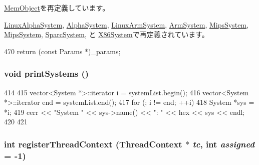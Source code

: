 \hyperlink{classMemObject_acd3c3feb78ae7a8f88fe0f110a718dff}{MemObject}を再定義しています。

\hyperlink{classLinuxAlphaSystem_acd3c3feb78ae7a8f88fe0f110a718dff}{LinuxAlphaSystem}, \hyperlink{classAlphaSystem_acd3c3feb78ae7a8f88fe0f110a718dff}{AlphaSystem}, \hyperlink{classLinuxArmSystem_acd3c3feb78ae7a8f88fe0f110a718dff}{LinuxArmSystem}, \hyperlink{classArmSystem_acd3c3feb78ae7a8f88fe0f110a718dff}{ArmSystem}, \hyperlink{classMipsSystem_acd3c3feb78ae7a8f88fe0f110a718dff}{MipsSystem}, \hyperlink{classMipsSystem_acd3c3feb78ae7a8f88fe0f110a718dff}{MipsSystem}, \hyperlink{classSparcSystem_acd3c3feb78ae7a8f88fe0f110a718dff}{SparcSystem}, と \hyperlink{classX86System_acd3c3feb78ae7a8f88fe0f110a718dff}{X86System}で再定義されています。


\begin{DoxyCode}
470 { return (const Params *)_params; }
\end{DoxyCode}
\hypertarget{classSystem_a55206d1ab112cc51ccc3bbefdcc5b923}{
\subsubsection[{printSystems}]{\setlength{\rightskip}{0pt plus 5cm}void printSystems ()}}
\label{classSystem_a55206d1ab112cc51ccc3bbefdcc5b923}



\begin{DoxyCode}
414 {
415     vector<System *>::iterator i = systemList.begin();
416     vector<System *>::iterator end = systemList.end();
417     for (; i != end; ++i) {
418         System *sys = *i;
419         cerr << "System " << sys->name() << ": " << hex << sys << endl;
420     }
421 }
\end{DoxyCode}
\hypertarget{classSystem_a7211419d4d2d396946880da898f5dbbf}{
\subsubsection[{registerThreadContext}]{\setlength{\rightskip}{0pt plus 5cm}int registerThreadContext ({\bf ThreadContext} $\ast$ {\em tc}, \/  int {\em assigned} = {\ttfamily -\/1})}}
\label{classSystem_a7211419d4d2d396946880da898f5dbbf}



